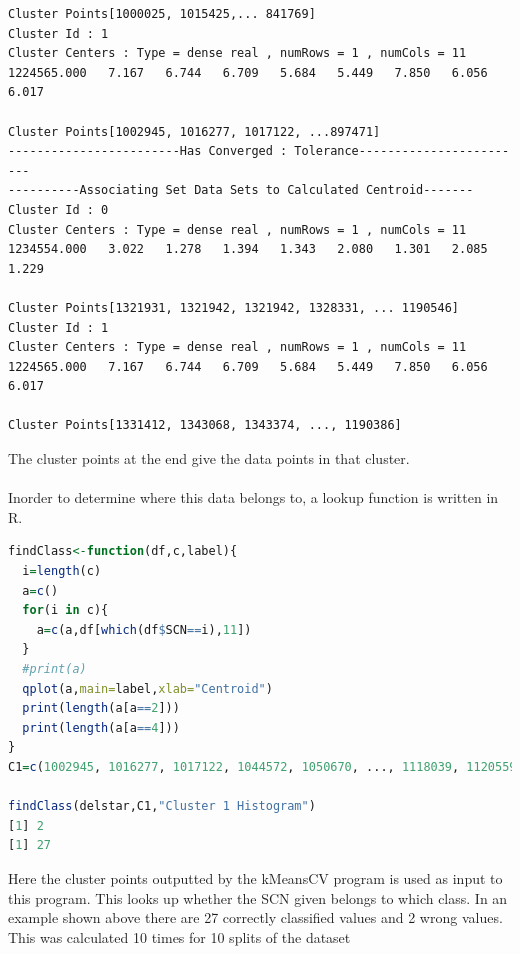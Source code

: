 \documentclass{article}
\begin{document}
\begin{enumerate}
\begin{verbatim}
Cluster Points[1000025, 1015425,... 841769]
Cluster Id : 1
Cluster Centers : Type = dense real , numRows = 1 , numCols = 11
1224565.000   7.167   6.744   6.709   5.684   5.449   7.850   6.056   6.017  

Cluster Points[1002945, 1016277, 1017122, ...897471]
------------------------Has Converged : Tolerance------------------------
----------Associating Set Data Sets to Calculated Centroid-------
Cluster Id : 0
Cluster Centers : Type = dense real , numRows = 1 , numCols = 11
1234554.000   3.022   1.278   1.394   1.343   2.080   1.301   2.085   1.229  

Cluster Points[1321931, 1321942, 1321942, 1328331, ... 1190546]
Cluster Id : 1
Cluster Centers : Type = dense real , numRows = 1 , numCols = 11
1224565.000   7.167   6.744   6.709   5.684   5.449   7.850   6.056   6.017  

Cluster Points[1331412, 1343068, 1343374, ..., 1190386]

\end{verbatim}
The cluster points at the end give the data points in that cluster.\\ \\
Inorder to determine where this data belongs to, a lookup function is written in R.
\begin{lstlisting}[language=R]
findClass<-function(df,c,label){
  i=length(c)
  a=c()
  for(i in c){
    a=c(a,df[which(df$SCN==i),11])
  }
  #print(a)
  qplot(a,main=label,xlab="Centroid")
  print(length(a[a==2]))
  print(length(a[a==4]))
}
C1=c(1002945, 1016277, 1017122, 1044572, 1050670, ..., 1118039, 1120559)

findClass(delstar,C1,"Cluster 1 Histogram")
[1] 2
[1] 27
\end{lstlisting}
Here the cluster points outputted by the kMeansCV program is used as input to this program. This looks up whether the SCN given belongs to which class. In an example shown above there are 27 correctly classified values and 2 wrong values. This was calculated 10 times for 10 splits of the dataset
\end{enumerate}
\end{document}
